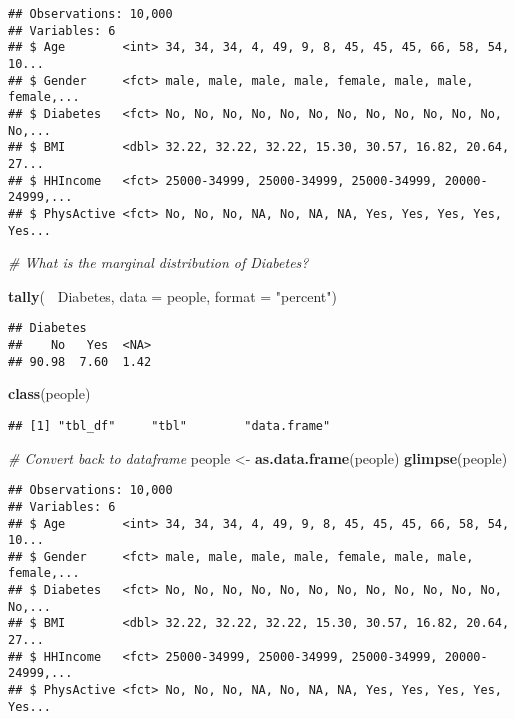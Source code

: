 \documentclass[]{article}
\newenvironment{Shaded}{\begin{snugshade}}{\end{snugshade}}
\newcommand{\KeywordTok}[1]{\textcolor[rgb]{0.13,0.29,0.53}{\textbf{#1}}}
\newcommand{\DataTypeTok}[1]{\textcolor[rgb]{0.13,0.29,0.53}{#1}}
\newcommand{\StringTok}[1]{\textcolor[rgb]{0.31,0.60,0.02}{#1}}
\newcommand{\CommentTok}[1]{\textcolor[rgb]{0.56,0.35,0.01}{\textit{#1}}}
\newcommand{\OperatorTok}[1]{\textcolor[rgb]{0.81,0.36,0.00}{\textbf{#1}}}
\newcommand{\NormalTok}[1]{#1}
\begin{document}
\begin{verbatim}
## Observations: 10,000
## Variables: 6
## $ Age        <int> 34, 34, 34, 4, 49, 9, 8, 45, 45, 45, 66, 58, 54, 10...
## $ Gender     <fct> male, male, male, male, female, male, male, female,...
## $ Diabetes   <fct> No, No, No, No, No, No, No, No, No, No, No, No, No,...
## $ BMI        <dbl> 32.22, 32.22, 32.22, 15.30, 30.57, 16.82, 20.64, 27...
## $ HHIncome   <fct> 25000-34999, 25000-34999, 25000-34999, 20000-24999,...
## $ PhysActive <fct> No, No, No, NA, No, NA, NA, Yes, Yes, Yes, Yes, Yes...
\end{verbatim}

\begin{Shaded}
\begin{Highlighting}[]
\CommentTok{# What is the marginal distribution of Diabetes?}

\KeywordTok{tally}\NormalTok{(}\OperatorTok{~}\StringTok{ }\NormalTok{Diabetes, }\DataTypeTok{data =}\NormalTok{ people, }\DataTypeTok{format =} \StringTok{"percent"}\NormalTok{)}
\end{Highlighting}
\end{Shaded}

\begin{verbatim}
## Diabetes
##    No   Yes  <NA> 
## 90.98  7.60  1.42
\end{verbatim}

\begin{Shaded}
\begin{Highlighting}[]
\KeywordTok{class}\NormalTok{(people)}
\end{Highlighting}
\end{Shaded}

\begin{verbatim}
## [1] "tbl_df"     "tbl"        "data.frame"
\end{verbatim}

\begin{Shaded}
\begin{Highlighting}[]
\CommentTok{# Convert back to dataframe}
\NormalTok{people <-}\StringTok{ }\KeywordTok{as.data.frame}\NormalTok{(people)}
\KeywordTok{glimpse}\NormalTok{(people)}
\end{Highlighting}
\end{Shaded}

\begin{verbatim}
## Observations: 10,000
## Variables: 6
## $ Age        <int> 34, 34, 34, 4, 49, 9, 8, 45, 45, 45, 66, 58, 54, 10...
## $ Gender     <fct> male, male, male, male, female, male, male, female,...
## $ Diabetes   <fct> No, No, No, No, No, No, No, No, No, No, No, No, No,...
## $ BMI        <dbl> 32.22, 32.22, 32.22, 15.30, 30.57, 16.82, 20.64, 27...
## $ HHIncome   <fct> 25000-34999, 25000-34999, 25000-34999, 20000-24999,...
## $ PhysActive <fct> No, No, No, NA, No, NA, NA, Yes, Yes, Yes, Yes, Yes...
\end{verbatim}
\end{document}

